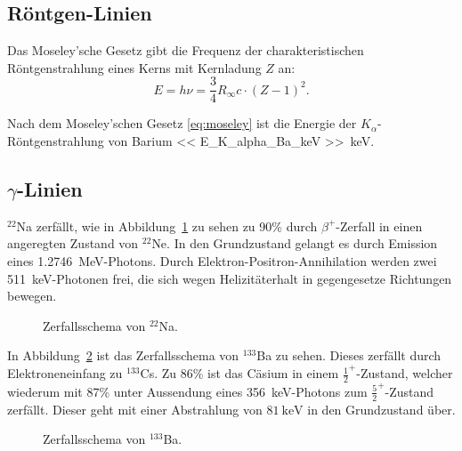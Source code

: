 \subsection{Röntgen-Linien}

Das Moseley'sche Gesetz gibt die Frequenz der charakteristischen
Röntgenstrahlung eines Kerns mit Kernladung $Z$ an:
\parencite[(17.10)]{meschede-gerthsen_24}
\begin{equation}
    \label{eq:moseley}
    E = h \nu = \frac 34 R_\infty c \cdot (Z - 1)^2.
\end{equation}

Nach dem Moseley'schen Gesetz \eqref{eq:moseley} ist die Energie der
$K_\alpha$-Röntgenstrahlung von Barium \SI{<< E_K_alpha_Ba_keV
>>}{\kilo\electronvolt}.

\subsection{$\gamma$-Linien}

${}^{22}$Na zerfällt, wie in Abbildung~\ref{fig:Na-Zerfall} zu sehen zu 90\%
durch $\beta^+$-Zerfall in einen angeregten Zustand von ${}^{22}$Ne. In den
Grundzustand gelangt es durch Emission eines
\SI{1.2746}{\mega\electronvolt}-Photons. Durch Elektron-Positron-Annihilation
werden zwei \SI{511}{\kilo\electronvolt}-Photonen frei, die sich wegen
Helizitäterhalt in gegengesetze Richtungen bewegen.

\begin{figure}[htbp]
    \centering
    \caption{%
        Zerfallsschema von ${}^{22}$Na.
    }
    \label{fig:Na-Zerfall}
\end{figure}

In Abbildung~\ref{fig:Ba-Zerfall} ist das Zerfallsschema von ${}^{133}$Ba zu
sehen. Dieses zerfällt durch Elektroneneinfang zu ${}^{133}$Cs. Zu 86\% ist das
Cäsium in einem $\frac{1}{2}^+$-Zustand, welcher wiederum mit 87\% unter
Aussendung eines \SI{356}{\kilo\electronvolt}-Photons zum
$\frac{5}{2}^+$-Zustand zerfällt. Dieser geht mit einer Abstrahlung von
$\SI{81}{\kilo\electronvolt}$ in den Grundzustand über.

\begin{figure}[htbp]
    \centering
    \caption{%
        Zerfallsschema von ${}^{133}$Ba.
    }
    \label{fig:Ba-Zerfall}
\end{figure}

